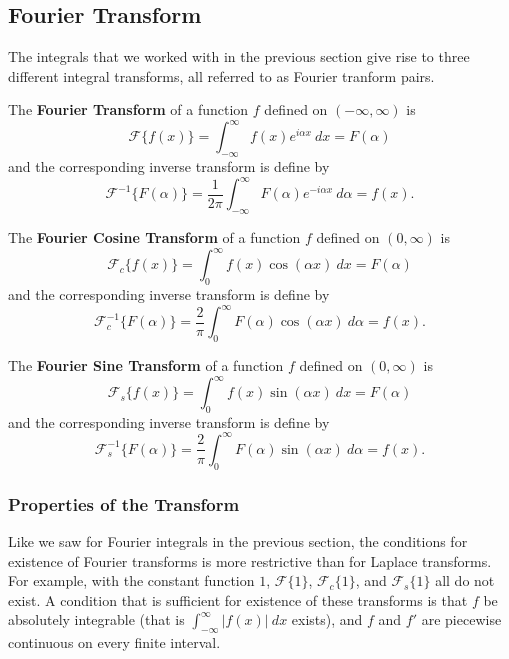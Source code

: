 \documentclass{ximera}
\begin{document}
\subsection{Fourier Transform}

The integrals that we worked with in the previous section give rise to three different integral transforms, all referred to as Fourier tranform pairs. 

\begin{definition}
    The \textbf{Fourier Transform} of a function $f$ defined on $(-\infty, \infty)$ is
    \[ 
        \mathcal{F}\{f(x)\} = \int_{-\infty}^\infty f(x)e^{i\alpha x}\ dx = F(\alpha) 
    \] 
    and the corresponding inverse transform is define by 
    \[ 
        \mathcal{F}^{-1}\{F(\alpha)\} = \frac{1}{2\pi} \int_{-\infty}^\infty F(\alpha)e^{-i\alpha x}\ d\alpha = f(x). 
    \]
    
    The \textbf{Fourier Cosine Transform} of a function $f$ defined on $(0, \infty)$ is
    \[ 
        \mathcal{F}_c\{f(x)\} = \int_{0}^\infty f(x)\cos(\alpha x)\ dx = F(\alpha) 
    \] 
    and the corresponding inverse transform is define by 
    \[ 
        \mathcal{F}_c^{-1}\{F(\alpha)\} = \frac{2}{\pi} \int_{0}^\infty F(\alpha)\cos(\alpha x)\ d\alpha = f(x). 
    \]
    
    The \textbf{Fourier Sine Transform} of a function $f$ defined on $(0, \infty)$ is
    \[ 
        \mathcal{F}_s\{f(x)\} = \int_{0}^\infty f(x)\sin(\alpha x)\ dx = F(\alpha) 
    \] 
    and the corresponding inverse transform is define by 
    \[ 
        \mathcal{F}_s^{-1}\{F(\alpha)\} = \frac{2}{\pi} \int_{0}^\infty F(\alpha)\sin(\alpha x)\ d\alpha = f(x). 
    \]
\end{definition}

\subsubsection{Properties of the Transform}

Like we saw for Fourier integrals in the previous section, the conditions for existence of Fourier transforms is more restrictive than for Laplace transforms. For example, with the constant function $1$, $\mathcal{F}\{1\}$, $\mathcal{F}_c\{1\}$, and $\mathcal{F}_s\{1\}$ all do not exist. A condition that is sufficient for existence of these transforms is that $f$ be absolutely integrable (that is $\int_{-\infty}^\infty |f(x)| \ dx$ exists), and $f$ and $f'$ are piecewise continuous on every finite interval. 
\end{document}
